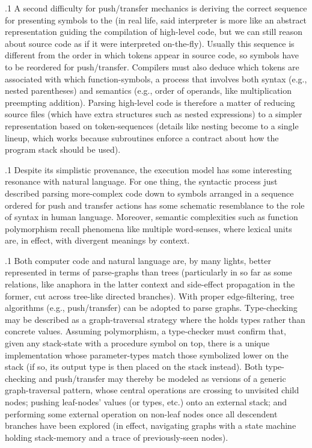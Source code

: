 \documentclass[11pt, twocolumn]{article}
\begin{document}
{{\p.1{%
A second difficulty for push/transfer mechanics is deriving the correct
sequence for presenting symbols to the  (in real life, said
interpreter is more like an abstract representation guiding the compilation
of high-level code, but we can still reason about source
code as if it were interpreted on-the-fly). Usually this sequence is
different from the order in which tokens appear in source code, so symbols
have to be reordered for push/transfer. Compilers must also deduce which tokens
are associated with which function-symbols, a process that involves
both syntax (e.g., nested parentheses) and semantics (e.g., order of operands,
like multiplication preempting addition). Parsing high-level code is therefore a
matter of reducing source files (which have extra structures such as nested
expressions) to a simpler representation based on token-sequences
(details like nesting become  to a single lineup, which works
because subroutines enforce a contract about how the program stack should be used).
}%

\p.1{%
Despite its simplistic provenance, the  execution model
has some interesting resonance with natural language. For one
thing, the syntactic process just described \mdash{} parsing more-complex
code down to symbols arranged in a sequence ordered for push and transfer
actions \mdash{} has some schematic resemblance to the role of syntax
in human language. Moreover, semantic complexities such as
function polymorphism recall phenomena like multiple word-senses,
where lexical units are, in effect,  with divergent
meanings by context.
}%

\p.1{%
Both computer code and natural language are, by many lights,
better represented in terms of parse-graphs than trees
(particularly in so far as some relations, like anaphora in the latter context
and side-effect propagation in the former, cut across tree-like
directed branches). With proper edge-filtering, tree 
algorithms (e.g., push/transfer) can be adopted to parse graphs.
Type-checking may be described as a graph-traversal
strategy where the  holds types rather
than concrete values. Assuming
polymorphism, \pgl{}a type-checker
must confirm that, given any stack-state with a
procedure symbol on top, there is a unique implementation
whose parameter-types match those symbolized lower on the stack
(if so, its output type is then placed on the stack
instead). Both type-checking
and push/transfer may thereby be modeled
as versions of a generic graph-traversal pattern, whose
central operations are crossing to unvisited child nodes;
pushing leaf-nodes' values (or types, etc.) onto an
external stack; and performing some external operation
on non-leaf nodes once all descendent branches have been explored
(in effect, navigating graphs with a state
machine holding stack-memory and a trace of previously-seen nodes).
}%

}}
\end{document}
